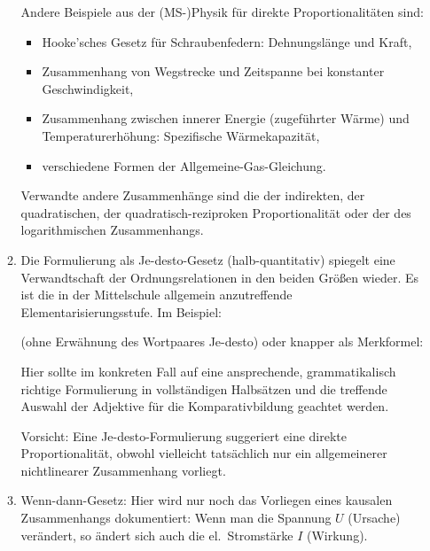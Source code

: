 \begin{enumerate}
\begin{enumerate}
\mip
Andere Beispiele aus der (MS-)Physik f\"{u}r direkte Proportionalit\"{a}ten sind:
\begin{itemize}
\item Hooke'sches Gesetz f\"{u}r Schraubenfedern: Dehnungsl\"{a}nge und Kraft,
\item Zusammenhang von Wegstrecke und Zeitspanne bei
konstanter Geschwindigkeit,
\item Zusammenhang zwischen
      innerer Energie (zugef\"{u}hrter W\"{a}rme) und
      Temperaturerh\"{o}hung: Spezifische W\"{a}rmekapazit\"{a}t,
\item verschiedene Formen der Allgemeine-Gas-Gleichung.
\end{itemize}

Verwandte andere Zusammenh\"{a}nge sind die der indirekten,
der quadratischen, der quadratisch-reziproken Proportionalit\"{a}t
oder der des logarithmischen Zusammenhangs.

\item
Die Formulierung als Je-desto-Gesetz (halb-quantitativ)
spiegelt eine Verwandtschaft der Ordnungsrelationen in
den beiden Gr\"{o}{\ss}en wieder.
Es ist die in der Mittelschule allgemein anzutreffende
Elementarisierungsstufe.
Im Beispiel:
\begin{quote}
\end{quote}
(ohne Erw\"{a}hnung des Wortpaares Je-desto) oder knapper
als Merkformel:
\begin{quote}

\end{quote}

 \mip
Hier sollte im konkreten Fall auf eine ansprechende, grammatikalisch
richtige Formulierung in vollst\"{a}ndigen Halbs\"{a}tzen und die treffende
Auswahl der Adjektive f\"{u}r die Komparativbildung geachtet werden.

\mip
Vorsicht: Eine Je-desto-Formulierung suggeriert eine direkte
Proportionalit\"{a}t, obwohl vielleicht tats\"{a}chlich nur ein allgemeinerer
nichtlinearer Zusammenhang vorliegt.

\item
Wenn-dann-Gesetz: Hier wird nur noch das Vorliegen eines kausalen
Zusammenhangs dokumentiert:
Wenn man die Spannung $U$ (Ursache) ver\"{a}ndert, so \"{a}ndert sich
auch die el.\ Stromst\"{a}rke $I$ (Wirkung).


\end{enumerate}
\end{enumerate}
